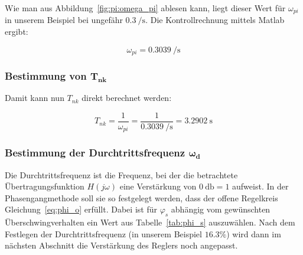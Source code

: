 Wie    man   aus    Abbildung~\ref{fig:pi:omega_pi}   ablesen    kann,   liegt
dieser   Wert  f\"ur   $\omega_{pi}$  in   unserem  Beispiel   bei  ungef\"ahr
$\SI{0.3}{\per\second}$. Die Kontrollrechnung mittels Matlab ergibt:

\begin{equation} \label{eq:pi:omega_pi}
    \omega_{pi} = \SI{0.3039}{\per\second}
\end{equation}


\subsubsection{Bestimmung von $\mathbf{T_{nk}}$}
Damit kann nun $T_{nk}$ direkt berechnet werden\footnotemark[5]:

\begin{equation} \label{eq:pi:omega_pi}
    T_{nk} = \frac{1}{\omega_{pi}} = \frac{1}{\SI{0.3039}{\per\second}} = \SI{3.2902}{\second}
\end{equation}



\subsubsection{Bestimmung der Durchtrittsfrequenz $\mathbf{\boldsymbol{\omega}_d}$}

Die   Durchtrittsfrequenz  ist   die   Frequenz,  bei   der  die   betrachtete
\"Ubertragungsfunktion $H(j\omega)$ eine Verst\"arkung von $\SI{0}{\decibel} =
1$  aufweist. In der  Phasengangmethode soll  sie so  festgelegt werden,  dass
der  offene  Regelkreis  Gleichung~\ref{eq:phi_o} erf\"ullt. Dabei  ist  f\"ur
$\varphi_s$ abh\"angig  vom gew\"unschten \"Uberschwingverhalten ein  Wert aus
Tabelle~\ref{tab:phi_s} auszuw\"ahlen\footnotemark[6].  Nach dem Festlegen der
Durchtrittsfrequenz  (in unserem  Beispiel $16.3\%$)  wird dann  im n\"achsten
Abschnitt die Verst\"arkung des Reglers noch angepasst.

